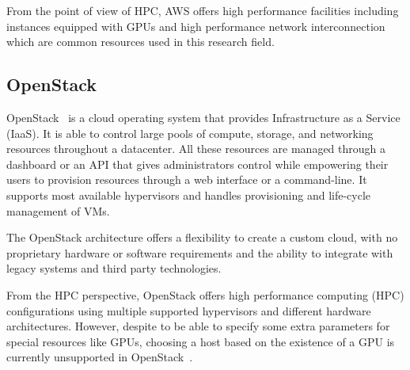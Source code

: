 \documentclass[a4paper,twoside]{article}
\begin{document}
From the point of view of HPC, AWS offers high performance facilities including 
instances equipped with GPUs and high performance network interconnection which 
are common resources used in this research field.

\subsection{OpenStack}
\label{sec:openstack}

OpenStack~\cite{OpenStack} is a cloud operating system that provides Infrastructure as a Service (IaaS). 
It is able to control large pools of compute, storage, and networking resources throughout a 
datacenter. All these resources are managed through a dashboard or an API that gives administrators 
control while empowering their users to provision resources through a web interface
or a command-line. 
It supports most available hypervisors and handles provisioning 
and life-cycle management of VMs.
 
The OpenStack architecture offers a flexibility to create a custom cloud, with no proprietary hardware
or software requirements and the ability to integrate with legacy systems and third party technologies. 

From the HPC perspective, OpenStack offers high performance computing (HPC) configurations using
multiple supported hypervisors and different hardware architectures. However, despite to be able to
specify some extra parameters for special resources like GPUs, choosing a host based on the existence
of a GPU is currently unsupported in OpenStack~\cite{OpenStackGPU}. 
\end{document}
